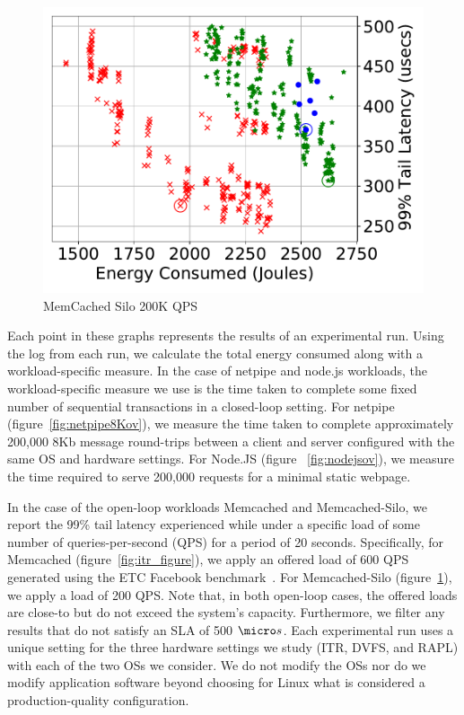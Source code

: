 \begin{figure}[t!]
\begin{minipage}[t]{0.45\textwidth}
	\label{fig:nodejsov}
\end{minipage}
\begin{minipage}[t]{0.45\textwidth}
	\includegraphics[width=\columnwidth]{osdi_figures/mcdsilo_200000_overview.pdf}
	\caption{MemCached Silo 200K QPS}
	\label{fig:mcdsiloov}
\end{minipage}
\end{figure}
Each point in these graphs represents the results of an experimental run.
Using the log from each run, we calculate the total energy consumed along with a workload-specific measure.
In the case of netpipe and node.js workloads, the workload-specific measure we use is the time taken to complete some fixed number of sequential transactions in a closed-loop setting.
For netpipe (figure~\ref{fig:netpipe8Kov}), we measure the time taken to complete approximately 200,000 8Kb message round-trips between a client and server configured with the same OS and hardware settings.
For Node.JS (figure ~\ref{fig:nodejsov}), we measure the time required to serve 200,000 requests for a minimal static webpage.

In the case of the open-loop workloads Memcached and Memcached-Silo, we report the 99\% tail latency experienced while under a specific load of some number of queries-per-second (QPS) for a period of 20 seconds.
Specifically, for Memcached (figure~\ref{fig:itr_figure}), we apply an offered load of 600 QPS generated using the ETC Facebook benchmark~\cite{mutilate}.
For Memcached-Silo (figure~\ref{fig:mcdsiloov}), we apply a load of 200 QPS.
Note that, in both open-loop cases, the offered loads are close-to but do not exceed the system's capacity.
Furthermore, we filter any results that do not satisfy an SLA of 500 $\micro s$.  
Each experimental run uses a unique setting for the three hardware settings we study (ITR, DVFS, and RAPL) with each of the two OSs we consider.
We do not modify the OSs nor do we modify application software beyond choosing for Linux what is considered a production-quality configuration.

